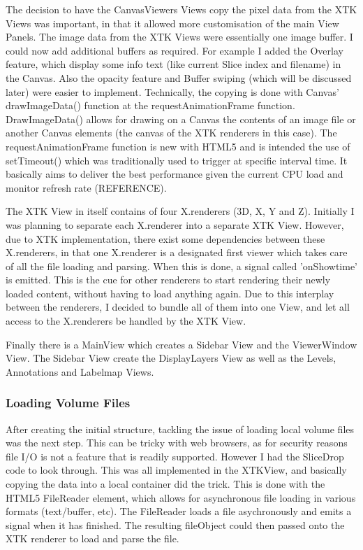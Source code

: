\documentclass[a4paper,11pt,twoside]{article}
\begin{document}
The decision to have the CanvasViewers Views copy the pixel data from the XTK Views was important, in that it allowed more customisation of the main View Panels. The image data from the XTK Views were essentially one image buffer. I could now add additional buffers as required. For example I added the Overlay feature, which display some info text (like current Slice index and filename) in the Canvas. Also the opacity feature and Buffer swiping (which will be discussed later) were easier to implement. Technically, the copying is done with Canvas' drawImageData() function at the requestAnimationFrame function. DrawImageData() allows for drawing on a Canvas the contents of an image file or another Canvas elements (the canvas of the XTK renderers in this case). The requestAnimationFrame function is new with HTML5 and is intended the use of setTimeout() which was traditionally used to trigger at specific interval time. It basically aims to deliver the best performance given the current CPU load and monitor refresh rate (REFERENCE).


The XTK View in itself contains of four X.renderers (3D, X, Y and Z). Initially I was planning to separate each X.renderer into a separate XTK View. However, due to XTK implementation, there exist some dependencies between these X.renderers, in that one X.renderer is a designated first viewer which takes care of all the file loading and parsing. When this is done, a signal called 'onShowtime' is emitted. This is the cue for other renderers to start rendering their newly loaded content, without having to load anything again. Due to this interplay between the renderers, I decided to bundle all of them into one View, and let all access to the X.renderers be handled by the XTK View.

Finally there is a MainView which creates a Sidebar View and the ViewerWindow View. The Sidebar View create the DisplayLayers View as well as the Levels, Annotations and Labelmap Views.


\subsubsection{Loading Volume Files}

After creating the initial structure, tackling the issue of loading local volume files was the next step. This can be tricky with web browsers, as for security reasons file I/O is not a feature that is readily supported. However I had the SliceDrop code to look through. This was all implemented in the XTKView, and basically copying the data into a local container did the trick. This is done with the HTML5 FileReader element, which allows for asynchronous file loading in various formats (text/buffer, etc). The FileReader loads a file asychronously and emits a signal when it has finished. The resulting fileObject could then passed onto the XTK renderer to load and parse the file.
\end{document}
